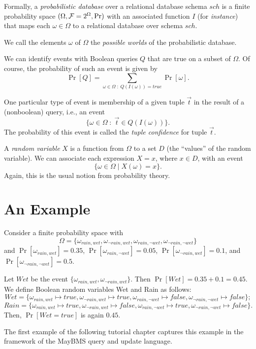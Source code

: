 Formally,
a {\em probabilistic database}\/ over a relational database schema $sch$
is a finite probability space $(\Omega, {\cal F} = 2^\Omega, \Pr)$ with an associated
function $I$ (for {\em instance}) that maps each
$\omega \in \Omega$ to a relational database
over schema $sch$.

We call the elements $\omega$ of $\Omega$ the {\em possible worlds}\/
of the probabilistic database.

We can identify events with Boolean queries $Q$ that are true on a subset of
$\Omega$. Of course, the probability of such an event is given by
\[
\Pr[Q] = \sum_{\omega \in \Omega \;:\; Q(I(\omega))=true} \Pr[\omega].
\]

One particular type of event is membership of a given tuple $\vec{t}$
in the result of a (nonboolean) query, i.e., an event
\[
\{\omega \in \Omega \;:\; \vec{t} \in Q(I(\omega)) \}.
\]
The probability of this event is called the
{\em tuple confidence}\/ for tuple $\vec{t}$. 


A {\em random variable} $X$ is a function from $\Omega$ to a set $D$
(the ``values'' of the random variable).
We can associate each expression $X=x$, where $x \in D$, with an event
\[
\{ \omega \in \Omega \mid X(\omega) = x \}.
\]
Again, this is the usual notion from probability theory.


\section{An Example}


Consider a finite probability space with
\[
\Omega = \{
\omega_{rain, wet},
\omega_{\neg rain, wet}, 
\omega_{rain, \neg wet},
\omega_{\neg rain, \neg wet}
\}
\]
and
$\Pr[\omega_{rain, wet}] = 0.35$,
$\Pr[\omega_{rain, \neg wet}] = 0.05$,
$\Pr[\omega_{\neg rain, wet}] = 0.1$, and
$\Pr[\omega_{\neg rain, \neg wet}] = 0.5$.

Let $Wet$ be the event $\{ \omega_{rain, wet}, \omega_{\neg rain, wet} \}$.
Then $\Pr[Wet] = 0.35+0.1 = 0.45$.
%
We define Boolean random variables Wet and Rain as follows:
\[
Wet = \{
\omega_{rain, wet} \mapsto true,
\omega_{\neg rain, wet} \mapsto true, 
\omega_{rain, \neg wet} \mapsto false,
\omega_{\neg rain, \neg wet} \mapsto false
\};
\]\[ 
Rain = \{
\omega_{rain, wet} \mapsto true,
\omega_{\neg rain, wet} \mapsto false, 
\omega_{rain, \neg wet} \mapsto true,
\omega_{\neg rain, \neg wet} \mapsto false
\}.
\]
Then, $\Pr[Wet=true]$ is again $0.45$.

The first example of the following tutorial chapter captures this
example in the framework of the MayBMS query and update language.


